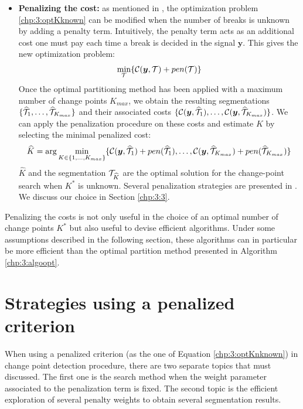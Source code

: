 \begin{itemize}
\begin{algorithm}[ht]
\end{algorithm} 
\item \textbf{Penalizing the cost:} as mentioned in \cite{truong2020}, the optimization problem \ref{chp:3:optKknown} can be modified when the number of breaks is unknown by adding a penalty term. Intuitively, the penalty term acts as an additional cost one must pay each time a break is decided in the signal $\bm y$. This gives the new optimization problem: 
\begin{equation}\label{chp:3:optKnknown}
\min_{{\mathcal T}} \{ \mathcal{C}(\bm y,{\mathcal T}) + pen({\mathcal T}) \} 
\end{equation}   
Once the optimal partitioning method has been applied with a maximum number of change points $K_{max}$, we obtain the resulting segmentations $\{\widehat{{\mathcal T}}_1,\dots,\widehat{{\mathcal T}}_{K_{max}}\}$ and their associated costs $\{{\mathcal C}(\bm y, \widehat{{\mathcal T}}_1),\dots,{\mathcal C}(\bm y, \widehat{{\mathcal T}}_{K_{max}})\}$. We can apply the penalization procedure on these costs and estimate $K$ by selecting the minimal penalized cost:
\begin{equation}\label{chp:3:Khat}
\widehat{K} = \arg\min_{K \in \{1,\dots,K_{max}\}} \{{\mathcal C}(\bm y, \widehat{{\mathcal T}}_1)+pen(\widehat{{\mathcal T}}_1),\dots,{\mathcal C}(\bm y, \widehat{{\mathcal T}}_{K_{max}})+pen(\widehat{{\mathcal T}}_{K_{max}})\} 
\end{equation}
$\widehat{K}$ and the segmentation ${\mathcal T}_{\widehat{K}}$ are the optimal solution for the change-point search when $K^*$ is unknown. Several penalization strategies are presented in \cite{truong2020}. We discuss our choice in Section \ref{chp:3:3}.  
\end{itemize}    

Penalizing the costs is not only useful in the choice of an optimal number of change points $K^*$ but also useful to devise efficient algorithms. Under some assumptions described in the following section, these algorithms can in particular be more efficient than the optimal partition method presented in Algorithm \ref{chp:3:algoopt}. 

\section{Strategies using a penalized criterion}\label{chp:3:4}

When using a penalized criterion (as the one of Equation \ref{chp:3:optKnknown}) in change point detection procedure, there are two separate topics that must discussed. The first one is the search method when the weight parameter associated to the penalization term is fixed. The second topic is the efficient exploration of several penalty weights to obtain several segmentation results.   

